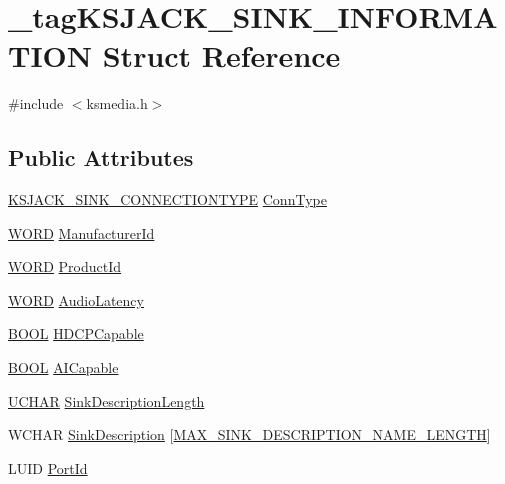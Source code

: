 \hypertarget{struct__tag_k_s_j_a_c_k___s_i_n_k___i_n_f_o_r_m_a_t_i_o_n}{}\section{\+\_\+tag\+K\+S\+J\+A\+C\+K\+\_\+\+S\+I\+N\+K\+\_\+\+I\+N\+F\+O\+R\+M\+A\+T\+I\+ON Struct Reference}
\label{struct__tag_k_s_j_a_c_k___s_i_n_k___i_n_f_o_r_m_a_t_i_o_n}


{\ttfamily \#include $<$ksmedia.\+h$>$}

\subsection*{Public Attributes}
\begin{DoxyCompactItemize}
\item 
\hyperlink{ksmedia_8h_a4aee4713fa49402a0c51b26a612c8dd1}{K\+S\+J\+A\+C\+K\+\_\+\+S\+I\+N\+K\+\_\+\+C\+O\+N\+N\+E\+C\+T\+I\+O\+N\+T\+Y\+PE} \hyperlink{struct__tag_k_s_j_a_c_k___s_i_n_k___i_n_f_o_r_m_a_t_i_o_n_a76a1f94b63acf9e93ad5e514d1529fff}{Conn\+Type}
\item 
\hyperlink{nfilterkit_8h_a7e62930c4614f6a59b33d693f01ce08e}{W\+O\+RD} \hyperlink{struct__tag_k_s_j_a_c_k___s_i_n_k___i_n_f_o_r_m_a_t_i_o_n_a5ddb4fe684d3bf9f816ea863707e4b16}{Manufacturer\+Id}
\item 
\hyperlink{nfilterkit_8h_a7e62930c4614f6a59b33d693f01ce08e}{W\+O\+RD} \hyperlink{struct__tag_k_s_j_a_c_k___s_i_n_k___i_n_f_o_r_m_a_t_i_o_n_a2989c04dc0b03132263e68b73926142c}{Product\+Id}
\item 
\hyperlink{nfilterkit_8h_a7e62930c4614f6a59b33d693f01ce08e}{W\+O\+RD} \hyperlink{struct__tag_k_s_j_a_c_k___s_i_n_k___i_n_f_o_r_m_a_t_i_o_n_a04fbeeacd3dcc7ab81de1105539df498}{Audio\+Latency}
\item 
\hyperlink{nfilterkit_8h_a3be13892ae7076009afcf121347dd319}{B\+O\+OL} \hyperlink{struct__tag_k_s_j_a_c_k___s_i_n_k___i_n_f_o_r_m_a_t_i_o_n_a41120f4b01ceb6e32e8315b42bdb5f76}{H\+D\+C\+P\+Capable}
\item 
\hyperlink{nfilterkit_8h_a3be13892ae7076009afcf121347dd319}{B\+O\+OL} \hyperlink{struct__tag_k_s_j_a_c_k___s_i_n_k___i_n_f_o_r_m_a_t_i_o_n_a5cb77b78de1b1861e5e3138e8a783b67}{A\+I\+Capable}
\item 
\hyperlink{xlisp_8h_a9a1dc6d243c6f75bb42f87e3f69649e4}{U\+C\+H\+AR} \hyperlink{struct__tag_k_s_j_a_c_k___s_i_n_k___i_n_f_o_r_m_a_t_i_o_n_ae06013e901d67da0d50294fd60e4dfb3}{Sink\+Description\+Length}
\item 
W\+C\+H\+AR \hyperlink{struct__tag_k_s_j_a_c_k___s_i_n_k___i_n_f_o_r_m_a_t_i_o_n_a8e88d8a5f68f7929ba69fa3da5544ea6}{Sink\+Description} \mbox{[}\hyperlink{ksmedia_8h_a9eb817a0371f23645dfdceba0903ab31}{M\+A\+X\+\_\+\+S\+I\+N\+K\+\_\+\+D\+E\+S\+C\+R\+I\+P\+T\+I\+O\+N\+\_\+\+N\+A\+M\+E\+\_\+\+L\+E\+N\+G\+TH}\mbox{]}
\item 
L\+U\+ID \hyperlink{struct__tag_k_s_j_a_c_k___s_i_n_k___i_n_f_o_r_m_a_t_i_o_n_af1ceb41acac11ecc2578f857590e7156}{Port\+Id}
\end{DoxyCompactItemize}


